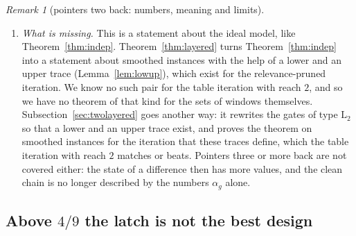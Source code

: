 \documentclass[11pt]{amsart}
\theoremstyle{definition}
\theoremstyle{remark}
\newtheorem{remark}[theorem]{Remark}
\begin{document}
\begin{remark}[pointers two back: numbers, meaning and limits]
\begin{enumerate}[label=(\roman*),leftmargin=2.4em]
the ideal model $\overline M$ is the mean spread, for that iteration, of a single undetermined
read when all other reads are determined; with two or more undetermined reads in a chain the
sets of windows are not unions of such pairs. For the relevance-pruned iteration even this is
not so: on the mixed base it needs many rounds up to noise about $0.55$
(Remark~\ref{rem:mixed}), because it cannot use that a kept gate of type $\mathrm L_2$ turns
a difference in state $\mathsf b$ into the hidden state $\mathsf c$, which ends at the next
gate if that gate has a far read.
\item \emph{What is missing.} This is a statement about the ideal model, like
Theorem~\ref{thm:indep}. Theorem~\ref{thm:layered} turns Theorem~\ref{thm:indep} into a
statement about smoothed instances with the help of a lower and an upper trace
(Lemma~\ref{lem:lowup}), which exist for the relevance-pruned iteration. We know no such pair
for the table iteration with reach $2$, and so we have no theorem of that kind for the sets of windows themselves.
Subsection~\ref{sec:twolayered} goes another way: it rewrites the gates of type $\mathrm L_2$
so that a lower and an upper trace exist, and proves the theorem on smoothed instances for the
iteration that these traces define, which the table iteration with reach $2$ matches or beats.
Pointers three or more back
are not covered either: the state of a difference then has more values, and the clean chain is
no longer described by the numbers $\alpha_g$ alone.
\end{enumerate}
\end{remark}

\subsection{Above \texorpdfstring{$4/9$}{4/9} the latch is not the best design}\label{sec:beyond}
\end{document}
